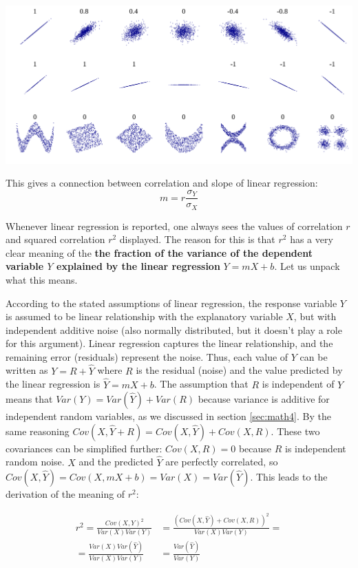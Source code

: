 \documentclass[
]{book}
\theoremstyle{definition}
\theoremstyle{definition}
\theoremstyle{definition}
\theoremstyle{remark}
\begin{document}
\includegraphics{ch8/Correlation_examples.png}
\label{fig:ch8_corr_examples}

This gives a connection between correlation and slope of linear regression:
\begin{equation}
m = r \frac{\sigma_Y}{\sigma_X}
\label{eq:slope_corr}
\end{equation}

Whenever linear regression is reported, one always sees the values of correlation \(r\) and squared correlation \(r^2\) displayed. The reason for this is that \(r^2\) has a very clear meaning of the \textbf{the fraction of the variance of the dependent variable \(Y\) explained by the linear regression} \(Y=mX+b\). Let us unpack what this means.

According to the stated assumptions of linear regression, the response variable \(Y\) is assumed to be linear relationship with the explanatory variable \(X\), but with independent additive noise (also normally distributed, but it doesn't play a role for this argument). Linear regression captures the linear relationship, and the remaining error (residuals) represent the noise. Thus, each value of \(Y\) can be written as \(Y = R + \hat Y\) where \(R\) is the residual (noise) and the value predicted by the linear regression is \(\hat Y =mX+b\). The assumption that \(R\) is independent of \(Y\) means that \(Var(Y) = Var (\hat Y) + Var (R)\) because variance is additive for independent random variables, as we discussed in section \ref{sec:math4}. By the same reasoning \(Cov(X,\hat Y + R) = Cov(X,\hat Y) + Cov(X,R)\). These two covariances can be simplified further: \(Cov(X,R) = 0\) because \(R\) is independent random noise. \(X\) and the predicted \(\hat Y\) are perfectly correlated, so \(Cov(X,\hat Y) = Cov(X,mX+b) = Var(X) = Var(\hat Y)\). This leads to the derivation of the meaning of \(r^2\):

\begin{equation}
\begin{aligned}
  r^2 = \frac{Cov(X,Y)^2}{Var(X) Var(Y)} &=   \frac{(Cov(X,\hat Y) + Cov(X,R) )^2}{Var(X) Var(Y)}   = \\
  =\frac{Var(X)Var(\hat Y)}{Var(X) Var(Y)} &=  \frac{Var(\hat Y)}{Var(Y)}
  \end{aligned}
\label{eq:ch8_frac_var}
\end{equation}
\end{document}
